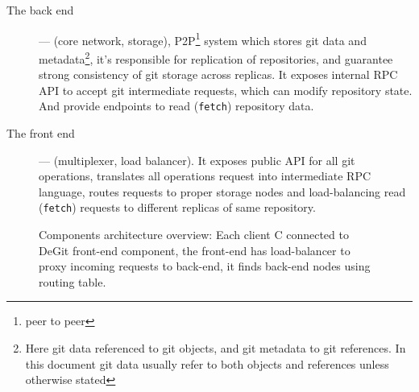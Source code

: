 \documentclass[nonacm=true]{acmart}
\newcommand{\code}[1]{\texttt{#1}}
\begin{document}
\begin{description}
  \item[The back end] --- (core network, storage), P2P\footnote{peer to peer} system which stores git data
    and metadata\footnote{Here git data referenced to git objects, and git metadata to git references.
    In this document git data usually refer to both objects and references unless otherwise stated},
    it's responsible for replication of repositories, and guarantee
    strong consistency of git storage across replicas. It exposes internal RPC API to accept git intermediate
    requests, which can modify repository state. And provide endpoints to read (\code{fetch}) repository data.
  \item[The front end] --- (multiplexer, load balancer). It exposes public API for all git operations,
    translates all operations request into intermediate RPC language, routes requests to proper storage
    nodes and load-balancing read (\code{fetch}) requests to different replicas of same repository.
\end{description}

\begin{figure}
  \begin{center}
  \end{center}
  \caption{
    Components architecture overview:
    Each client C connected to DeGit front-end component,
    the front-end has load-balancer to proxy incoming requests to back-end,
    it finds back-end nodes using routing table.
  }
  \label{fig:comp-arc-overview}
\end{figure}
\end{document}
